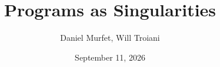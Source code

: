 \documentclass[english,letter paper,12pt,reqno]{article}
\title{Programs as Singularities}
\author{Daniel Murfet, Will Troiani}
\date{September 11, 2026}
\theoremstyle{definition}
\def\res{\operatorname{Res}}
\def\comp{\underline{\textup{comp}}}
\def\contract{\;\lrcorner\;}
\newcommand{\lto}{\longrightarrow}
\def\l{\,|\,}
\begin{document}
\def\ScoreOverhang{1pt}

\makeatletter
\DeclareRobustCommand{\rvdots}{%
  \vbox{
    \baselineskip4\p@\lineskiplimit\z@
    \kern-\p@
    \hbox{}\hbox{.}\hbox{.}\hbox{.}
  }}
\makeatother

\newcommand{\startproof}[1]{
	\AxiomC{#1}
	\noLine
	\UnaryInfC{$\vdots$}
}
\newcommand{\ax}{\operatorname{Ax}}
\newcommand{\proofvdots}[1]{\overset{\displaystyle #1}{\rvdots}}
\def\Res{\res\!}
\newcommand{\ud}[1]{\operatorname{d}\!{#1}}
\newcommand{\Ress}[1]{\res_{#1}\!}
\newcommand{\cat}[1]{\mathcal{#1}}
\newcommand{\xlto}[1]{\stackrel{#1}\lto}
\newcommand{\mf}[1]{\mathfrak{#1}}
\newcommand{\md}[1]{\mathscr{#1}}
\newcommand{\church}[1]{\underline{#1}}
\newcommand{\prf}[1]{\underline{#1}}
\newcommand{\den}[1]{\llbracket #1 \rrbracket}
\def\l{\,|\,}
\def\sgn{\textup{sgn}}
\def\cont{\operatorname{cont}}
\def\counit{\varepsilon}
\def\ptail{\underline{\operatorname{tail}}}
\def\phead{\underline{\operatorname{head}}}
\def\comp{\underline{\textup{comp}}}
\def\mult{\underline{\textup{mult}}}
\def\repeat{\underline{\textup{repeat}}}
\def\contract{\;\lrcorner\;}
\def\<{\langle} \def\>{\rangle}
\newcommand{\id}{\text{id}}
\newcommand{\del}{\partial}
\newcommand{\Inj}{\operatorname{Inj}}

\newcommand{\tTur}{\textbf{Tur}}
\newcommand{\tInt}{\textbf{int}}
\newcommand{\tBint}{\textbf{bint}}
\newcommand{\tList}{\textbf{list}}
\newcommand{\tTint}{\textbf{tint}}
\newcommand{\tMBool}{\textbf{${_m}$bool}}
\newcommand{\tNBool}{\textbf{${_n}$bool}}
\newcommand{\tSBool}{\textbf{${_s}$bool}}
\newcommand{\tHBool}{\textbf{${_h}$bool}}
\newcommand{\tSList}{{_s}\textbf{list}}

\newcommand{\reject}{\operatorname{reject}}
\newcommand{\accept}{\operatorname{accept}}
\end{document}
